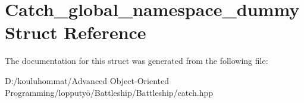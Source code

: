 \hypertarget{struct_catch__global__namespace__dummy}{}\section{Catch\+\_\+global\+\_\+namespace\+\_\+dummy Struct Reference}
\label{struct_catch__global__namespace__dummy}


The documentation for this struct was generated from the following file\+:\begin{DoxyCompactItemize}
\item 
D\+:/kouluhommat/\+Advanced Object-\/\+Oriented Programming/lopputyö/\+Battleship/\+Battleship/catch.\+hpp\end{DoxyCompactItemize}
